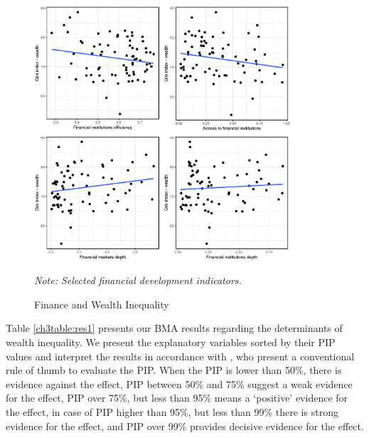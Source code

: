 \begin{refsection}
\begin{figure}[ht]
  \centering
  \caption{Finance and Wealth Inequality}
  \label{ch3fig:findev}
	\includegraphics[width=0.85\textwidth, keepaspectratio]{figures/ch3/plots_findev.eps}
  \begin{minipage}{0.8\textwidth}
    \footnotesize
    \emph{Note:  Selected financial development indicators.}
    \end{minipage}
\end{figure}

Table \ref{ch3table:res1} presents our \ac{BMA} results regarding the determinants of wealth inequality. We present the explanatory variables sorted by their \ac{PIP} values and interpret the results in accordance with \textcite{kass1995bayes}, who present a conventional rule of thumb to evaluate the \ac{PIP}. When the \ac{PIP} is lower than 50\%, there is evidence against the effect, \ac{PIP} between 50\% and 75\% suggest a weak evidence for the effect, \ac{PIP} over 75\%, but less than 95\% means a `positive' evidence for the effect, in case of \ac{PIP} higher than 95\%, but less than 99\% there is strong evidence for the effect, and \ac{PIP} over 99\% provides decisive evidence for the effect.


\end{refsection}
